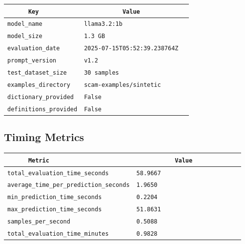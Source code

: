 \documentclass{article}
\begin{document}
\begin{center}
\begin{tabular}{l | l} \hline
    \verb|      Key      | & \verb|           Value           | \\ \hline
    \hline
    \verb|model_name    | & \verb|llama3.2:1b                  | \\ \hline
    \verb|model_size    | & \verb|1.3 GB                       | \\ \hline
    \verb|evaluation_date| & \verb|2025-07-15T05:52:39.238764Z  | \\ \hline
    \verb|prompt_version| & \verb|v1.2                         | \\ \hline
    \verb|test_dataset_size| & \verb|30 samples                   | \\ \hline
    \verb|examples_directory| & \verb|scam-examples/sintetic       | \\ \hline
    \verb|dictionary_provided| & \verb|False                        | \\ \hline
    \verb|definitions_provided| & \verb|False                        | \\ \hline
\end{tabular}
\end{center}

\subsection{Timing Metrics}

\begin{center}
\begin{tabular}{l | l} \hline
    \verb|      Metric     | & \verb|           Value           | \\ \hline
    \hline
    \verb|total_evaluation_time_seconds| & \verb|58.9667                      | \\ \hline
    \verb|average_time_per_prediction_seconds| & \verb|1.9650                       | \\ \hline
    \verb|min_prediction_time_seconds| & \verb|0.2204                       | \\ \hline
    \verb|max_prediction_time_seconds| & \verb|51.8631                      | \\ \hline
    \verb|samples_per_second| & \verb|0.5088                       | \\ \hline
    \verb|total_evaluation_time_minutes| & \verb|0.9828                       | \\ \hline
\end{tabular}
\end{center}
\end{document}
